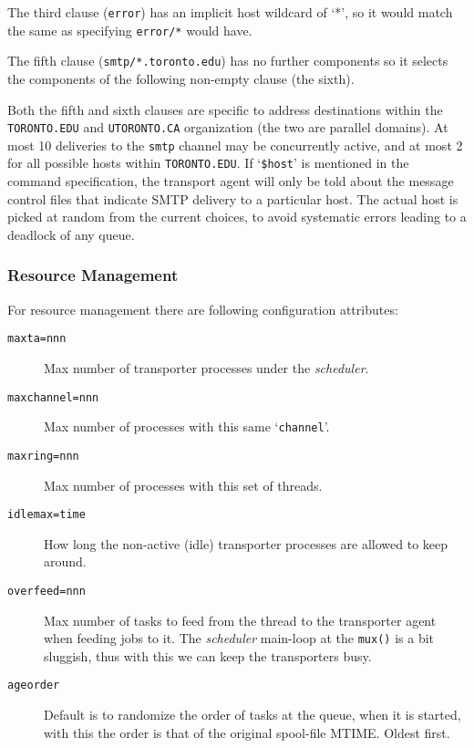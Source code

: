 The third clause ({\tt error}) has an implicit host wildcard of `*', 
so it would match the same as specifying {\tt error/*} would have.

The fifth clause ({\tt smtp/*.toronto.edu}) has no further components 
so it selects the components of the following non-empty clause (the sixth).

Both the fifth and sixth clauses are specific to address destinations
within the {\tt TORONTO.EDU} and {\tt UTORONTO.CA} organization (the 
two are parallel domains). At most 10 deliveries to the {\tt smtp} channel
may be concurrently active, and at most 2 for all possible hosts within
{\tt TORONTO.EDU}. If `{\tt \$host}' is mentioned in the command 
specification, the transport agent will only be told about the message 
control files that indicate SMTP delivery to a particular host. The actual 
host is picked at random from the current choices, to avoid systematic
errors leading to a deadlock of any queue. 






\subsubsection{Resource Management}



For resource management there are following configuration attributes: 

\begin{description}
\item[{\tt maxta=nnn}] \mbox{}

Max number of transporter processes under 
the {\em scheduler\/}. 

\item[{\tt maxchannel=nnn}] \mbox{}

Max number of processes with this same 
`{\tt channel}'. 

\item[{\tt maxring=nnn}] \mbox{}

Max number of processes with this set of 
threads. 

\item[{\tt idlemax=time}] \mbox{}

How long the non-active (idle) transporter 
processes are allowed to keep around. 

\item[{\tt overfeed=nnn}] \mbox{}

Max number of tasks to feed from the 
thread to the transporter agent when feeding jobs to it. The 
{\em scheduler\/} main-loop at the {\tt mux()} is a bit sluggish, 
thus with this we can keep the transporters busy. 

\item[{\tt ageorder}] \mbox{}

Default is to randomize the order of tasks 
at the queue, when it is started, with this the order is that of 
the original spool-file MTIME. Oldest first. 

\end{description}







